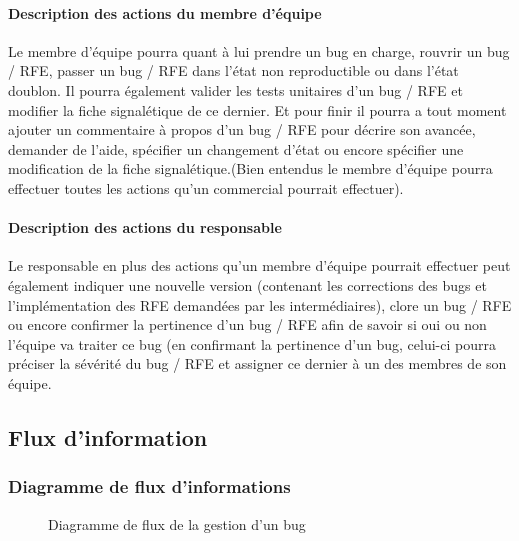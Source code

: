 \documentclass{article}[12pt]
\begin{document}
\paragraph{Description des actions du membre d'équipe}
Le membre d'équipe pourra quant à lui prendre un bug en charge, rouvrir un bug / RFE, passer un bug / RFE dans l'état non reproductible ou dans l'état doublon. Il pourra également valider les tests unitaires d'un bug / RFE et modifier la fiche signalétique de ce dernier. Et pour finir il pourra a tout moment ajouter un commentaire à propos d'un bug / RFE pour décrire son avancée, demander de l'aide, spécifier un changement d'état ou encore spécifier une modification de la fiche signalétique.(Bien entendus le membre d'équipe pourra effectuer toutes les actions qu'un commercial pourrait effectuer).
\paragraph{Description des actions du responsable}
Le responsable en plus des actions qu'un membre d'équipe pourrait effectuer peut également indiquer une nouvelle version (contenant les corrections des bugs et l'implémentation des RFE demandées par les intermédiaires), clore un bug / RFE ou encore confirmer la pertinence d'un bug / RFE afin de savoir si oui ou non l'équipe va traiter ce bug (en confirmant la pertinence d'un bug, celui-ci pourra préciser la sévérité du bug / RFE et assigner ce dernier à un des membres de son équipe.
\subsection{Flux d'information}
\subsubsection{Diagramme de flux d'informations}
\begin{figure}[H]
	\centering
	\caption{Diagramme de flux de la gestion d'un bug}
\end{figure}
\end{document}
